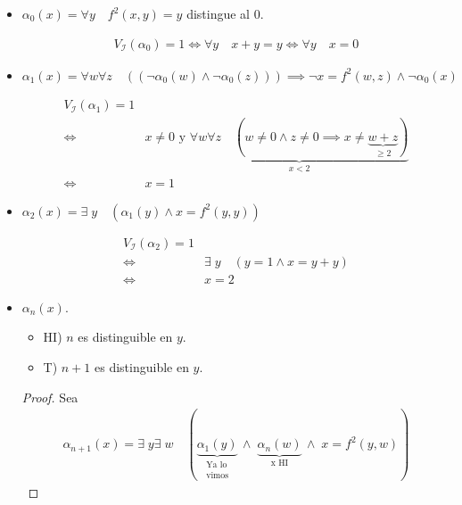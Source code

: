\begin{itemize}
    \item $\alpha_0(x) = \forall y \quad f^2(x,y) = y$ distingue al $0$.

        \begin{gather*}
            V_{\mathcal{I}}(\alpha_0) = 1
            \iff \forall y \quad x + y = y 
            \iff \forall y \quad x = 0
        \end{gather*}

    \item $\alpha_1(x) = \forall w \forall z \quad ((\neg \alpha_0(w) \wedge
        \neg \alpha_0(z))) \implies \neg x = f^2(w,z) \wedge \neg \alpha_0(x)$

        \begin{align*}
            V_{\mathcal{I}}(\alpha_1) = 1 \\
            \iff & x \neq 0 \text{ y }
            \underbrace{\forall w \forall z \quad (w \neq 0 \wedge z \neq 0
            \implies x \neq \underbrace{w + z}_{\geq 2})}_{x < 2} \\
            \iff & x = 1
        \end{align*}

    \item $\alpha_2(x) = \exists \; y \quad (\alpha_1(y) \wedge x = f^2(y,y))$

        \begin{align*}
            V_{\mathcal{I}}(\alpha_2) = 1 \\
            \iff & \exists \; y \quad (y=1 \wedge x = y+y) \\
            \iff & x = 2
        \end{align*}

    \item $\alpha_n(x)$.

        \begin{itemize}
            \item HI) $n$ es distinguible en $y$.
            \item T) $n+1$ es distinguible en $y$.
        \end{itemize}

        \begin{proof} \phantom{.}

            Sea
            \begin{gather*}
                \alpha_{n+1}(x) = \exists\; y \exists \; w
                \quad (
                \underbrace{\alpha_1(y)}_{\substack{\text{Ya lo}\\
                    \text{vimos}}} \,
                \wedge \;
                \underbrace{\alpha_n(w)}_{\text{x HI}} \,
                \wedge \;
                x = f^2(y,w))
            \end{gather*}


\end{proof}
\end{itemize}
